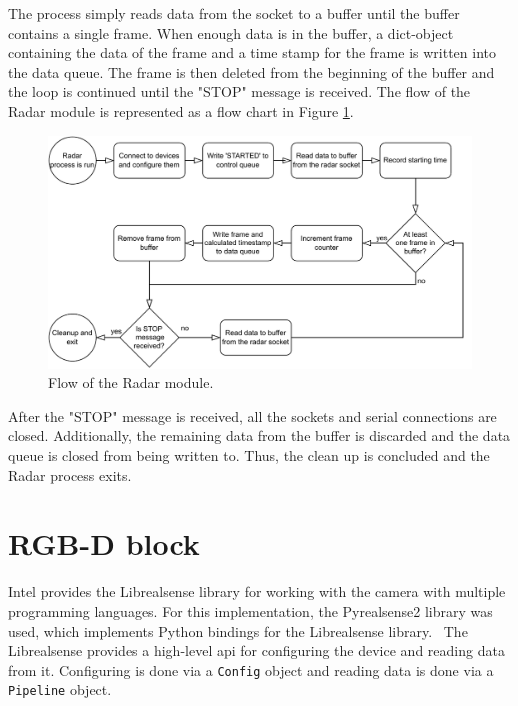 The process simply reads data from the socket to a buffer until the buffer contains a single frame.
When enough data is in the buffer, a dict-object containing the data of the frame and a time stamp for the frame is written into the data queue.
The frame is then deleted from the beginning of the buffer and the loop is continued until the "STOP" message is received.
The flow of the Radar module is represented as a flow chart in Figure \ref{fig:3-radar-flowchart}.

\begin{figure}[H]
    \centering
    \includegraphics[width=\textwidth]{fig/3/radar-flowchart.pdf}
    \caption{Flow of the Radar module.}
    \label{fig:3-radar-flowchart}
\end{figure}

After the "STOP" message is received,
all the sockets and serial connections are closed.
Additionally, the remaining data from the buffer is discarded and the data queue is closed from being written to.
Thus, the clean up is concluded and the Radar process exits.

\section{RGB-D block}
\label{sec:3-rgb-d}
Intel provides the Librealsense library for working with the camera with multiple programming languages.
For this implementation, the Pyrealsense2 library was used, which implements Python bindings for the Librealsense library.~\cite{librealsense2}
The Librealsense provides a high-level \gls{api} for configuring the device and reading data from it.
Configuring is done via a \texttt{Config} object and reading data is done via a \texttt{Pipeline} object.~\cite{librealsense2-python-docs}

